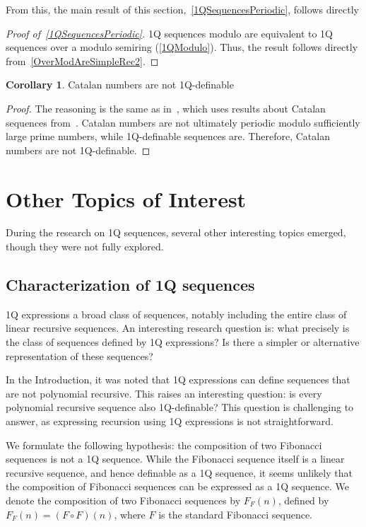 \documentclass[en]{pracamgr}
\theoremstyle{definition}
\newtheorem{corollary}{Corollary}[section]
\begin{document}
From this, the main result of this section,~\cref{1QSequencesPeriodic}, follows directly

\begin{proof}[Proof of~\cref{1QSequencesPeriodic}]
    1Q sequences modulo are equivalent to 1Q sequences over a modulo semiring (\cref{1QModulo}). Thus, the result follows directly from~\cref{OverModAreSimpleRec2}.
\end{proof}

\begin{corollary}
    Catalan numbers are not 1Q-definable
\end{corollary}

\begin{proof}
    The reasoning is the same as in~\cite[Theorem 7, Corollary 8]{CadilhacMPPS20}, which uses results about Catalan sequences from~\cite{KubotaCatalan}. Catalan numbers are not ultimately periodic modulo sufficiently large prime numbers, while 1Q-definable sequences are. Therefore, Catalan numbers are not 1Q-definable.
\end{proof}

\chapter{Other Topics of Interest}
\label{SecOther}
During the research on 1Q sequences, several other interesting topics emerged, though they were not fully explored.

\section{Characterization of 1Q sequences}
\label{CharacterizationOf1QSequences}
1Q expressions a broad class of sequences, notably including the entire class of linear recursive sequences. An interesting research question is: what precisely is the class of sequences defined by 1Q expressions? Is there a simpler or alternative representation of these sequences?

In the Introduction, it was noted that 1Q expressions can define sequences that are not polynomial recursive. This raises an interesting question: is every polynomial recursive sequence also 1Q-definable? This question is challenging to answer, as expressing recursion using 1Q expressions is not straightforward.

We formulate the following hypothesis: the composition of two Fibonacci sequences is not a 1Q sequence. While the Fibonacci sequence itself is a linear recursive sequence, and hence definable as a 1Q sequence, it seems unlikely that the composition of Fibonacci sequences can be expressed as a 1Q sequence. We denote the composition of two Fibonacci sequences by $F_F (n)$, defined by $F_F (n) = (F \circ F) (n)$, where $F$ is the standard Fibonacci sequence.
\end{document}

